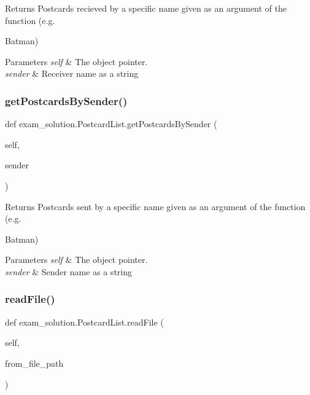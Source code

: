 Returns Postcards recieved by a specific name given as an argument of the function (e.\+g. 

\textquotesingle{}Batman\textquotesingle{}) 
\begin{DoxyParams}{Parameters}
{\em self} & The object pointer. \\
\hline
{\em sender} & Receiver name as a string \\
\hline
\end{DoxyParams}
\mbox{\label{classexam__solution_1_1PostcardList_aaae0e8f143179e658fcb4e5275dc4b70}} 
\subsubsection{\texorpdfstring{getPostcardsBySender()}{getPostcardsBySender()}}
{\footnotesize\ttfamily def exam\+\_\+solution.\+Postcard\+List.\+get\+Postcards\+By\+Sender (\begin{DoxyParamCaption}\item[{}]{self,  }\item[{}]{sender }\end{DoxyParamCaption})}



Returns Postcards sent by a specific name given as an argument of the function (e.\+g. 

\textquotesingle{}Batman\textquotesingle{}) 
\begin{DoxyParams}{Parameters}
{\em self} & The object pointer. \\
\hline
{\em sender} & Sender name as a string \\
\hline
\end{DoxyParams}
\mbox{\label{classexam__solution_1_1PostcardList_a6557eef9090b67d4b680be50b99e7fcd}} 
\subsubsection{\texorpdfstring{readFile()}{readFile()}}
{\footnotesize\ttfamily def exam\+\_\+solution.\+Postcard\+List.\+read\+File (\begin{DoxyParamCaption}\item[{}]{self,  }\item[{}]{from\+\_\+file\+\_\+path }\end{DoxyParamCaption})}



